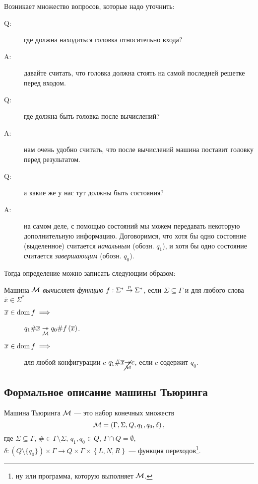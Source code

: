 Возникает множество вопросов, которые надо уточнить:
\begin{description}
    \item[Q:] где должна находиться головка относительно входа?
    \item[A:] давайте считать, что головка должна стоять на самой последней решетке перед входом.
    \item[Q:] где должна быть головка после вычислений?
    \item[A:] нам очень удобно считать, что после вычислений машина поставит головку перед результатом.
    \item[Q:] а какие же у нас тут должны быть состояния?
    \item[A:] на самом деле, с помощью состояний мы можем передавать некоторую дополнительную информацию.
    Договоримся, что хотя бы одно состояние (выделенное) считается {\it начальным} (обозн. $q_{1}$), и хотя бы одно состояние считается {\it завершающим} (обозн. $q_{0}$).
\end{description}
Тогда определение можно записать следующим образом:
\begin{definition}
    Машина $\mathcal{M}$ {\it вычисляет функцию} $f: \Sigma^{*} \overset{p}{\to} \Sigma^{*}$, если $\Sigma \subseteq \Gamma$ и для любого слова $\overline{x} \in  \Sigma^{*}$
    \begin{description}
        \item[$\overline{x} \in \operatorname{dom} f \implies$] $q_{1}\#\overline{x} \underset{\mathcal{M}}{\twoheadrightarrow} q_{0}\#f\left(\overline{x}\right)$.
        \item[$\overline{x} \in \operatorname{dom} f \implies$] для любой конфигурации $c$ $q_{1} \# \overline{x} \cancel{\underset{\mathcal{M}}{\twoheadrightarrow}} c$, если $c$ содержит $q_{0}$.
    \end{description}
\end{definition}

\subsection{Формальное описание машины Тьюринга}

\begin{definition}
    Машина Тьюринга $\mathcal{M}$ --- это набор конечных множеств
    $$
        \mathcal{M} = \left(\Gamma, \Sigma, Q, q_{1}, q_{0}, \delta\right),
    $$
    где $\Sigma \subseteq \Gamma$, $\# \in \Gamma \setminus \Sigma$, $q_{1}, q_{0} \in Q$, $\Gamma \cap Q = \emptyset$, $\delta: \left(Q \setminus \{q_{0}\}\right) \times \Gamma \to Q \times \Gamma \times \left\{L, N, R\right\}$ --- функция переходов\footnote{ну или программа, которую выполняет $\mathcal{M}$.}.
\end{definition}

